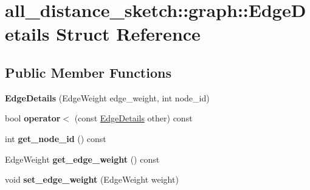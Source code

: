 \hypertarget{structall__distance__sketch_1_1graph_1_1EdgeDetails}{}\section{all\+\_\+distance\+\_\+sketch\+:\+:graph\+:\+:Edge\+Details Struct Reference}
\label{structall__distance__sketch_1_1graph_1_1EdgeDetails}
\subsection*{Public Member Functions}
\begin{DoxyCompactItemize}
\item 
\hypertarget{structall__distance__sketch_1_1graph_1_1EdgeDetails_aa55d6baa5d74877753c43098280c2734}{}{\bfseries Edge\+Details} (Edge\+Weight edge\+\_\+weight, int node\+\_\+id)\label{structall__distance__sketch_1_1graph_1_1EdgeDetails_aa55d6baa5d74877753c43098280c2734}

\item 
\hypertarget{structall__distance__sketch_1_1graph_1_1EdgeDetails_a22d83dd84d6fb604ab30a3feb74d37e5}{}bool {\bfseries operator$<$} (const \hyperlink{structall__distance__sketch_1_1graph_1_1EdgeDetails}{Edge\+Details} other) const \label{structall__distance__sketch_1_1graph_1_1EdgeDetails_a22d83dd84d6fb604ab30a3feb74d37e5}

\item 
\hypertarget{structall__distance__sketch_1_1graph_1_1EdgeDetails_aab20c43ccd77eec667e54d24fbdfe166}{}int {\bfseries get\+\_\+node\+\_\+id} () const \label{structall__distance__sketch_1_1graph_1_1EdgeDetails_aab20c43ccd77eec667e54d24fbdfe166}

\item 
\hypertarget{structall__distance__sketch_1_1graph_1_1EdgeDetails_a834dfa5527c6eb3a95d8cb52e9c02a56}{}Edge\+Weight {\bfseries get\+\_\+edge\+\_\+weight} () const \label{structall__distance__sketch_1_1graph_1_1EdgeDetails_a834dfa5527c6eb3a95d8cb52e9c02a56}

\item 
\hypertarget{structall__distance__sketch_1_1graph_1_1EdgeDetails_a040d612e56820319481d9c14accd3891}{}void {\bfseries set\+\_\+edge\+\_\+weight} (Edge\+Weight weight)\label{structall__distance__sketch_1_1graph_1_1EdgeDetails_a040d612e56820319481d9c14accd3891}

\end{DoxyCompactItemize}
